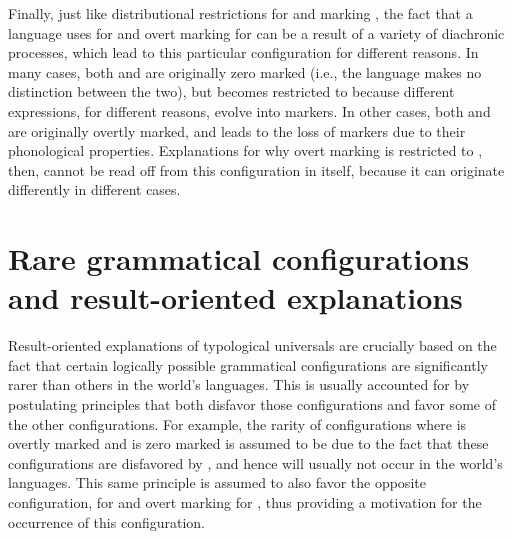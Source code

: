 \documentclass[output=paper]{langsci/langscibook}
\begin{document}
Finally, just like distributional restrictions for  and
  marking , the fact that a language uses  for 
and overt marking for  can be a result of a variety of
diachronic processes,
 which lead to this particular configuration for different
reasons.  
In many cases, both  and  are originally zero marked (i.e., the language makes no distinction between the two), but
 becomes restricted to  because different expressions, for different reasons, evolve into 
markers.  In other cases, both
 and  are originally overtly marked, and 
leads to the loss of  markers due to their phonological
properties. Explanations for why overt marking is restricted to , then,  cannot be read off from this configuration in itself,
because it can originate differently in different cases.


\section{Rare grammatical configurations and result-oriented explanations}\label{martin}

Result-oriented explanations of typological universals are crucially
 based on
the fact that certain logically possible grammatical configurations
are significantly rarer than
others in the world's languages. This is usually accounted for by
postulating  principles that both disfavor those configurations
and favor some of the other configurations. For
example, the rarity of configurations where  is
overtly marked and  is zero marked is assumed to be due to the
fact that these configurations are disfavored by , and hence
will usually not occur in  the world's languages. This same
principle is assumed to also favor the opposite configuration,  for
 and overt marking for , thus providing a motivation for
the occurrence of this configuration.
\end{document}
